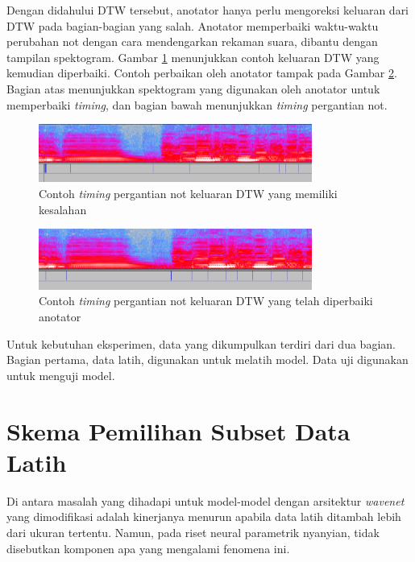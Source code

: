 Dengan didahului DTW tersebut, anotator hanya perlu mengoreksi keluaran dari DTW pada bagian-bagian yang salah. Anotator memperbaiki waktu-waktu perubahan not dengan cara mendengarkan rekaman suara, dibantu dengan tampilan spektogram. Gambar \ref{dtw-output-example} menunjukkan contoh keluaran DTW yang kemudian diperbaiki. Contoh perbaikan oleh anotator tampak pada Gambar \ref{dtw-output-example-corrected}. Bagian atas menunjukkan spektogram yang digunakan oleh anotator untuk memperbaiki \textit{timing}, dan bagian bawah menunjukkan \textit{timing} pergantian not.

\begin{figure}[htb]
  \centering
  \includegraphics[width=0.8\textwidth]{resources/DTW-output-example.png}
  \caption{Contoh \textit{timing} pergantian not keluaran DTW yang memiliki kesalahan} \label{dtw-output-example}
\end{figure}

\begin{figure}[htb]
  \centering
  \includegraphics[width=0.8\textwidth]{resources/DTW-output-corrected-example.png}
  \caption{Contoh \textit{timing} pergantian not keluaran DTW yang telah diperbaiki anotator} \label{dtw-output-example-corrected}
\end{figure}

Untuk kebutuhan eksperimen, data yang dikumpulkan terdiri dari dua bagian. Bagian pertama, data latih, digunakan untuk melatih model. Data uji digunakan untuk menguji model.

\section{Skema Pemilihan Subset Data Latih}\label{subsetselectionsection}

Di antara masalah yang dihadapi untuk model-model dengan arsitektur \textit{wavenet} yang dimodifikasi adalah kinerjanya menurun apabila data latih ditambah lebih dari ukuran tertentu. Namun, pada riset neural parametrik nyanyian, tidak disebutkan komponen apa yang mengalami fenomena ini.

